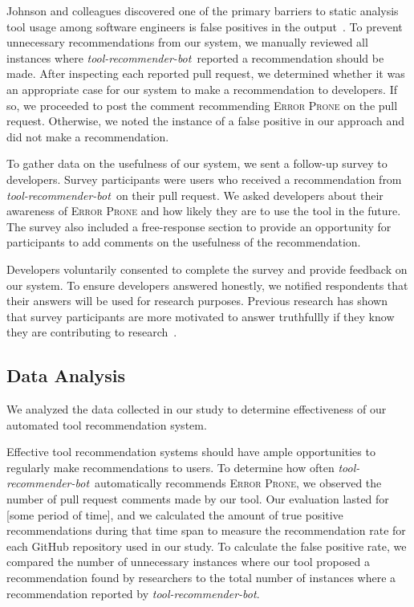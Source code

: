 \documentclass[conference]{IEEEtran}
\newcommand{\tool}{\textsl{tool-recommender-bot}}
\newcommand{\pseudosubsection}[1]{\vspace{2mm} \noindent{\it #1}}
\begin{document}
Johnson and colleagues discovered one of the primary barriers to static analysis tool usage among software engineers is false positives in the output~\cite{Johnson2013Why}. To prevent unnecessary recommendations from our system, we manually reviewed all instances where \tool~reported a recommendation should be made. After inspecting each reported pull request, we determined whether it was an appropriate case for our system to make a recommendation to developers. If so, we proceeded to post the comment recommending \textsc{Error Prone} on the pull request. Otherwise, we noted the instance of a false positive in our approach and did not make a recommendation.

\pseudosubsection{RQ2}

To gather data on the usefulness of our system, we sent a follow-up survey to developers. Survey participants were users who received a recommendation from \tool~on their pull request. We asked developers about their awareness of \textsc{Error Prone} and how likely they are to use the tool in the future. The survey also included a free-response section to provide an opportunity for participants to add comments on the usefulness of the recommendation.

Developers voluntarily consented to complete the survey and provide feedback on our system. To ensure developers answered honestly, we notified respondents that their answers will be used for research purposes. Previous research has shown that survey participants are more motivated to answer truthfullly if they know they are contributing to research~\cite{Krosnick1991Research}.

\subsection{Data Analysis}

We analyzed the data collected in our study to determine effectiveness of our automated tool recommendation system.

\pseudosubsection{RQ1}

Effective tool recommendation systems should have ample opportunities to regularly make recommendations to users. To determine how often \tool~automatically recommends \textsc{Error Prone}, we observed the number of pull request comments made by our tool. Our evaluation lasted for [some period of time], and we calculated the amount of true positive recommendations during that time span to measure the recommendation rate for each GitHub repository used in our study. To calculate the false positive rate, we compared the number of unnecessary instances where our tool proposed a recommendation found by researchers to the total number of instances where a recommendation reported by \tool.
\end{document}

